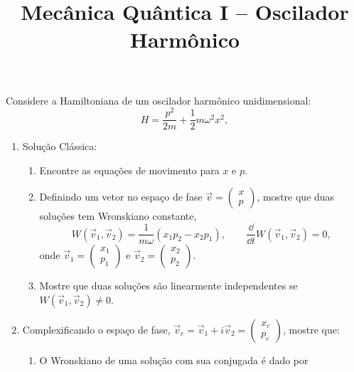 \newif\ifuseseminar
\useseminartrue


\title{Mecânica Quântica I -- Oscilador Harmônico}	



Considere a Hamiltoniana de um oscilador harmônico unidimensional:
\begin{equation*}
  H = \frac{p^2}{2m} + \frac{1}{2}m\omega^2x^2,
\end{equation*}
\begin{enumerate}
  \item Solução Clássica:
        \begin{enumerate}
          \item Encontre as equações de movimento para $x$ e $p$.
          \item Definindo um vetor no espaço de fase $\vec{v} = \begin{pmatrix} x \\ p
                  \end{pmatrix}$, mostre que duas soluções tem Wronskiano constante,
                \begin{equation*}
                  W(\vec{v}_1, \vec{v}_2) = \frac{1}{m\omega}\left(x_1p_2 - x_2p_1\right),
                  \qquad \frac{\dd}{\dd t} W(\vec{v}_1, \vec{v}_2) = 0,
                \end{equation*}
                onde $\vec{v}_1 = \begin{pmatrix} x_1 \\ p_1 \end{pmatrix}$ e $\vec{v}_2 =
                  \begin{pmatrix} x_2 \\ p_2 \end{pmatrix}$.
          \item Mostre que duas soluções são linearmente independentes se $W(\vec{v}_1,
                  \vec{v}_2) \neq 0$.
        \end{enumerate}
  \item Complexificando o espaço de fase, $\vec{v}_c = \vec{v}_1 + i\vec{v}_2 =
          \begin{pmatrix} x_c \\ p_c \end{pmatrix}$, mostre que:
        \begin{enumerate}
          \item O Wronskiano de uma solução com sua conjugada é dado por
                \begin{equation*}

\end{equation*}
\end{enumerate}
\end{enumerate}
